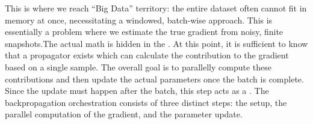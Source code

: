 \par This is where we reach \enquote{Big Data} territory: the entire dataset often cannot fit in memory at once, necessitating a windowed, batch-wise approach. This is essentially a  problem where we estimate the true gradient from noisy, finite snapshots.The actual math is hidden in the . At this point, it is sufficient to know that a propagator exists which can calculate the contribution to the gradient based on a single sample. The overall goal is to parallelly compute these contributions and then update the actual parameters once the batch is complete. Since the update must happen after the batch, this step acts as a . The backpropagation orchestration consists of three distinct steps: the setup, the parallel computation of the gradient, and the parameter update.\par
